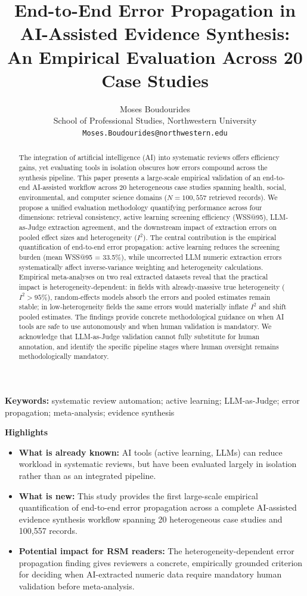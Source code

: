 \documentclass[12pt]{article}
\title{End-to-End Error Propagation in AI-Assisted Evidence Synthesis: An Empirical Evaluation Across 20 Case Studies}
\author{Moses Boudourides\\
\small School of Professional Studies, Northwestern University\\
\small \texttt{Moses.Boudourides@northwestern.edu}}
\date{}
\begin{document}
\maketitle

\begin{abstract}
The integration of artificial intelligence (AI) into systematic reviews offers efficiency gains, yet evaluating tools in isolation obscures how errors compound across the synthesis pipeline. This paper presents a large-scale empirical validation of an end-to-end AI-assisted workflow across 20 heterogeneous case studies spanning health, social, environmental, and computer science domains ($N = 100{,}557$ retrieved records). We propose a unified evaluation methodology quantifying performance across four dimensions: retrieval consistency, active learning screening efficiency (WSS@95), LLM-as-Judge extraction agreement, and the downstream impact of extraction errors on pooled effect sizes and heterogeneity ($I^2$). The central contribution is the empirical quantification of end-to-end error propagation: active learning reduces the screening burden (mean WSS@95 = 33.5\%), while uncorrected LLM numeric extraction errors systematically affect inverse-variance weighting and heterogeneity calculations. Empirical meta-analyses on two real extracted datasets reveal that the practical impact is heterogeneity-dependent: in fields with already-massive true heterogeneity ($I^2 > 95\%$), random-effects models absorb the errors and pooled estimates remain stable; in low-heterogeneity fields the same errors would materially inflate $I^2$ and shift pooled estimates. The findings provide concrete methodological guidance on when AI tools are safe to use autonomously and when human validation is mandatory. We acknowledge that LLM-as-Judge validation cannot fully substitute for human annotation, and identify the specific pipeline stages where human oversight remains methodologically mandatory.
\end{abstract}

\noindent\textbf{Keywords:} systematic review automation; active learning; LLM-as-Judge; error propagation; meta-analysis; evidence synthesis

\vspace{1em}
\noindent\textbf{Highlights}
\begin{itemize}[leftmargin=1.5em]
  \item \textbf{What is already known:} AI tools (active learning, LLMs) can reduce workload in systematic reviews, but have been evaluated largely in isolation rather than as an integrated pipeline.
  \item \textbf{What is new:} This study provides the first large-scale empirical quantification of end-to-end error propagation across a complete AI-assisted evidence synthesis workflow spanning 20 heterogeneous case studies and 100,557 records.
  \item \textbf{Potential impact for RSM readers:} The heterogeneity-dependent error propagation finding gives reviewers a concrete, empirically grounded criterion for deciding when AI-extracted numeric data require mandatory human validation before meta-analysis.
\end{itemize}
\end{document}
